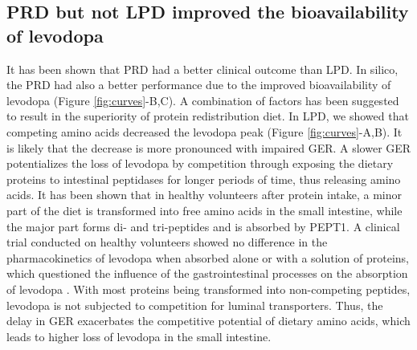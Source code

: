 \subsection{PRD but not LPD improved the bioavailability of levodopa}
It has been shown that PRD had a better clinical outcome than
LPD\cite{cereda2010low}. In silico, the PRD had also a better performance due to the improved bioavailability of levodopa (Figure \ref{fig:curves}-B,C). A combination of factors has been suggested to result in the superiority of protein redistribution diet\cite{cereda2010low}. In LPD, we showed that competing amino acids decreased the levodopa peak (Figure \ref{fig:curves}-A,B). It is likely that the decrease is more pronounced with impaired GER.
A slower GER potentializes the loss of levodopa by competition
through exposing the dietary proteins to intestinal peptidases for
longer periods of time, thus releasing amino acids. It has been
shown that in healthy volunteers after protein intake, a minor part
of the diet is transformed into free amino acids in the small
intestine, while the major part forms di- and tri-peptides and
is absorbed by PEPT1\cite{adibi1973protein}. A clinical trial conducted on healthy volunteers showed no difference in the pharmacokinetics of levodopa when absorbed alone or with a solution of proteins, which questioned the influence of the gastrointestinal processes on the absorption of levodopa \cite{robertson1991influence}. With most proteins being transformed into non-competing peptides, levodopa is not subjected to competition for luminal transporters. Thus, the delay in GER exacerbates the competitive potential of dietary amino acids, which leads to higher loss of levodopa in the small intestine.
